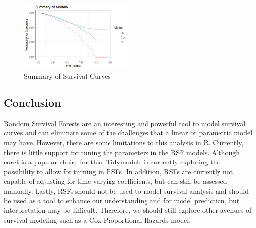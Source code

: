 \documentclass[a4paper,man,natbib,11pt]{article}
\begin{document}
\begin{figure}[h!]%
    \centering
    \includegraphics[width=0.5\textwidth]{figures/Summary_curves.png}
    \caption{Summary of Survival Curves}%
    \label{fig:all_curves}%
\end{figure}

\subsection{Conclusion}

Random Survival Forests are an interesting and powerful tool to model survival curves and can eliminate some of the challenges that a linear or parametric model may have. However, there are some limitations to this analysis in R. Currently, there is little support for tuning the parameters in the RSF models. Although caret is a popular choice for this, Tidymodels is currently exploring the possibility to allow for turning in RSFs. In addition, RSFs are currently not capable of adjusting for time varying coefficients, but can still be assessed manually. Lastly, RSFs should not be used to model survival analysis and should be used as a tool to enhance our understanding and for model prediction, but interpretation may be difficult. Therefore, we should still explore other avenues of survival modeling such as a Cox Proportional Hazards model.
\end{document}
